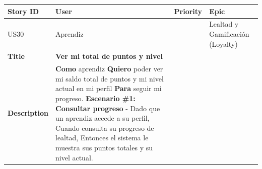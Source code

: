 {\def\LTcaptype{none} %
\begin{longtable}[]{@{}
  >{\raggedright\arraybackslash}p{}
  >{\raggedright\arraybackslash}p{}
  >{\raggedright\arraybackslash}p{}
  >{\raggedright\arraybackslash}p{}@{}}
\toprule\noalign{}
\begin{minipage}[b]{\linewidth}\raggedright
Story ID
\end{minipage} & \begin{minipage}[b]{\linewidth}\raggedright
User
\end{minipage} & \begin{minipage}[b]{\linewidth}\raggedright
Priority
\end{minipage} & \begin{minipage}[b]{\linewidth}\raggedright
Epic
\end{minipage} \\
\midrule\noalign{}
\endhead
\bottomrule\noalign{}
\endlastfoot
US30 & Aprendiz & 1 & Lealtad y Gamificación (Loyalty) \\
\textbf{Title} & \textbf{Ver mi total de puntos y nivel} & & \\
\textbf{Description} & \textbf{Como} aprendiz \textbf{Quiero} poder ver
mi saldo total de puntos y mi nivel actual en mi perfil \textbf{Para}
seguir mi progreso. \textbf{Escenario \#1: Consultar progreso} - Dado
que un aprendiz accede a su perfil, Cuando consulta su progreso de
lealtad, Entonces el sistema le muestra sus puntos totales y su nivel
actual. & & \\
\end{longtable}
}

